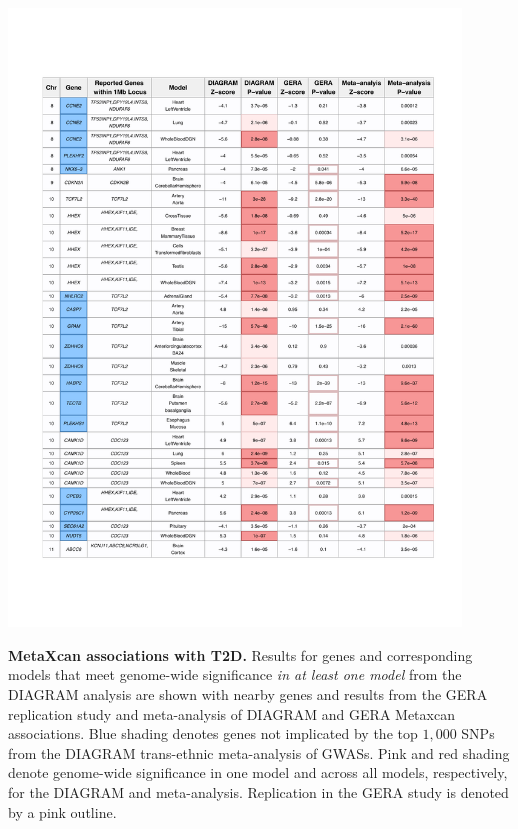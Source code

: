 \documentclass[10pt]{article}
\begin{document}
\clearpage
\begin{table}
	\ContinuedFloat
	\includegraphics[width=0.90\textwidth]{supp_tab1_part3.pdf}
	\caption{\textbf{MetaXcan associations with T2D.} Results for genes and corresponding models that meet genome-wide significance \textit{in at least one model} from the DIAGRAM analysis are shown with nearby genes and results from the GERA replication study and meta-analysis of DIAGRAM and GERA Metaxcan associations. Blue shading denotes genes not implicated by the top $1,000$ SNPs from the DIAGRAM trans-ethnic meta-analysis of GWASs. Pink and red shading denote genome-wide significance in one model and across all models, respectively, for the DIAGRAM and meta-analysis. Replication in the GERA study is denoted by a pink outline.} 
	\label{tab:supp.table1.part3}
\end{table}
\end{document}

